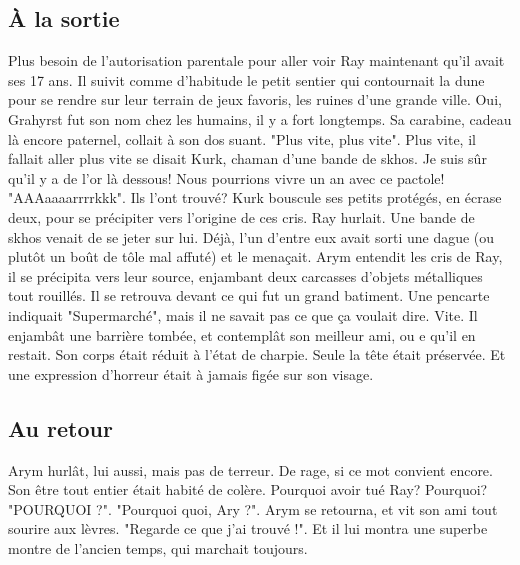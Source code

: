 \subsection{À la sortie}
Plus besoin de l'autorisation parentale pour aller voir Ray maintenant qu'il avait ses 17 ans. Il suivit comme d'habitude le petit sentier qui contournait la dune pour se rendre sur leur terrain de jeux favoris, les ruines d'une grande ville. Oui, Grahyrst fut son nom chez les humains, il y a fort longtemps. Sa carabine, cadeau là encore paternel, collait à son dos suant.
\newline
"Plus vite, plus vite". Plus vite, il fallait aller plus vite se disait Kurk, chaman d'une bande de skhos. Je suis sûr qu'il y a de l'or là dessous! Nous pourrions vivre un an avec ce pactole! "AAAaaaarrrrkkk". Ils l'ont trouvé? Kurk bouscule ses petits protégés, en écrase deux, pour se précipiter vers l'origine de ces cris.
\newline
Ray hurlait. Une bande de skhos venait de se jeter sur lui. Déjà, l'un d'entre eux avait sorti une dague (ou plutôt un boût de tôle mal affuté) et le menaçait.
\newline
Arym entendit les cris de Ray, il se précipita vers leur source, enjambant deux carcasses d'objets métalliques tout rouillés. Il se retrouva devant ce qui fut un grand batiment. Une pencarte indiquait "Supermarché", mais il ne savait pas ce que ça voulait dire. Vite. Il enjambât une barrière tombée, et contemplât son meilleur ami, ou e qu'il en restait. Son corps était réduit à l'état de charpie. Seule la tête était préservée. Et une expression d'horreur était à jamais figée sur son visage.
\subsection{Au retour}
Arym hurlât, lui aussi, mais pas de terreur. De rage, si ce mot convient encore. Son être tout entier était habité de colère. Pourquoi avoir tué Ray? Pourquoi? "POURQUOI ?". 
\newline
"Pourquoi quoi, Ary ?". Arym se retourna, et vit son ami tout sourire aux lèvres. "Regarde ce que j'ai trouvé !". Et il lui montra une superbe montre de l'ancien temps, qui marchait toujours. 